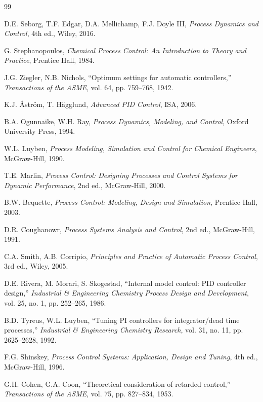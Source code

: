 \documentclass[11pt,a4paper]{article}
\begin{document}

\begin{thebibliography}{99}

D.E. Seborg, T.F. Edgar, D.A. Mellichamp, F.J. Doyle III,
\textit{Process Dynamics and Control}, 4th ed.,
Wiley, 2016.

G. Stephanopoulos,
\textit{Chemical Process Control: An Introduction to Theory and Practice},
Prentice Hall, 1984.

J.G. Ziegler, N.B. Nichols,
``Optimum settings for automatic controllers,''
\textit{Transactions of the ASME}, vol. 64, pp. 759--768, 1942.

K.J. {\AA}str{\"o}m, T. H{\"a}gglund,
\textit{Advanced PID Control},
ISA, 2006.

B.A. Ogunnaike, W.H. Ray,
\textit{Process Dynamics, Modeling, and Control},
Oxford University Press, 1994.

W.L. Luyben,
\textit{Process Modeling, Simulation and Control for Chemical Engineers},
McGraw-Hill, 1990.

T.E. Marlin,
\textit{Process Control: Designing Processes and Control Systems for Dynamic Performance},
2nd ed., McGraw-Hill, 2000.

B.W. Bequette,
\textit{Process Control: Modeling, Design and Simulation},
Prentice Hall, 2003.

D.R. Coughanowr,
\textit{Process Systems Analysis and Control},
2nd ed., McGraw-Hill, 1991.

C.A. Smith, A.B. Corripio,
\textit{Principles and Practice of Automatic Process Control},
3rd ed., Wiley, 2005.

D.E. Rivera, M. Morari, S. Skogestad,
``Internal model control: PID controller design,''
\textit{Industrial \& Engineering Chemistry Process Design and Development},
vol. 25, no. 1, pp. 252--265, 1986.

B.D. Tyreus, W.L. Luyben,
``Tuning PI controllers for integrator/dead time processes,''
\textit{Industrial \& Engineering Chemistry Research},
vol. 31, no. 11, pp. 2625--2628, 1992.

F.G. Shinskey,
\textit{Process Control Systems: Application, Design and Tuning},
4th ed., McGraw-Hill, 1996.

G.H. Cohen, G.A. Coon,
``Theoretical consideration of retarded control,''
\textit{Transactions of the ASME}, vol. 75, pp. 827--834, 1953.


\end{thebibliography}
\end{document}
